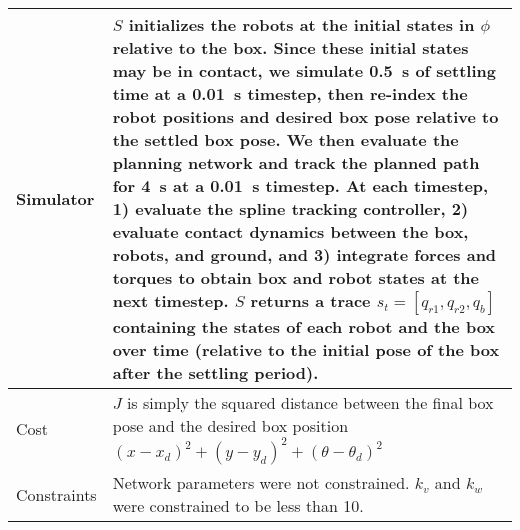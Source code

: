 \begin{table}[tb]
\begin{tabular}{|p{2.5cm}|p{14cm}|}
        Simulator            & $S$ initializes the robots at the initial states in $\phi$ relative to the box. Since these initial states may be in contact, we simulate \SI{0.5}{s} of settling time at a \SI{0.01}{s} timestep, then re-index the robot positions and desired box pose relative to the settled box pose. We then evaluate the planning network and track the planned path for \SI{4}{s} at a \SI{0.01}{s} timestep. At each timestep, 1) evaluate the spline tracking controller, 2) evaluate contact dynamics between the box, robots, and ground, and 3) integrate forces and torques to obtain box and robot states at the next timestep. $S$ returns a trace $s_t = [q_{r1}, q_{r2}, q_{b}]$ containing the states of each robot and the box over time (relative to the initial pose of the box after the settling period). \\ \hline
        Cost                 & $J$ is simply the squared distance between the final box pose and the desired box position $(x - x_d)^2 + (y - y_d)^2 + (\theta - \theta_d)^2$                                                                                                                                                                                                                                                                                                                                                                                                                                                                                                                                                                                                                                                                     \\ \hline
        Constraints          & Network parameters were not constrained. $k_v$ and $k_w$ were constrained to be less than 10.                                                                                                                                                                                                                                                                                                                                                                                                                                                                                                                                                                                                                                                                                                                      \\ \hline
    \end{tabular}
\end{table}
